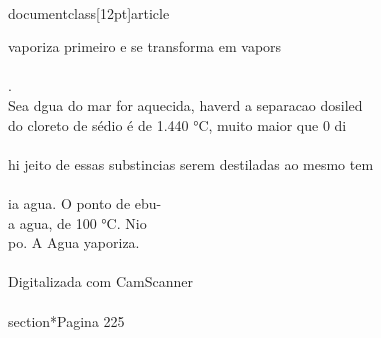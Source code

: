 \\documentclass[12pt]{article}
\begin{document}
{vaporiza primeiro e se transforma em vapors\\
\\
.\\
Sea dgua do mar for aquecida, haverd a separacao dosiled\\
do cloreto de sédio é de 1.440 °C, muito maior que 0 di\\
\\
hi jeito de essas substincias serem destiladas ao mesmo tem\\
\\
ia agua. O ponto de ebu-\\
a agua, de 100 °C. Nio\\
po. A Agua yaporiza.\\
\\
Digitalizada com CamScanner\\

\\section*{Pagina 225}

}
\end{document}

